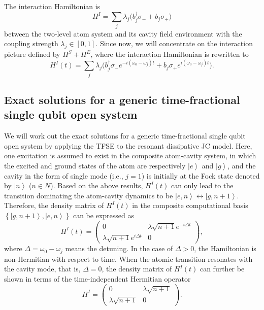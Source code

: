 \documentclass[
showpacs,  %
showkeys,  %
aps,       %
amsthm,    %
amsmath,   %
amsfonts,  %
amssymb    %
]{revtex4-1}          %
\begin{document}
The interaction Hamiltonian is
\begin{equation}
\label{e8}
{H^I} = \sum\limits_j {{\lambda _j}(} b_j^\dag {\sigma _ - } + {b_j}{\sigma _ + })
\end{equation}
between the two-level atom system and its cavity field environment with the coupling strength ${\lambda _j}\in\left[{0,1}\right]$. Since now, we will concentrate on the interaction picture defined by ${H^S} + {H^E}$, where the interaction Hamiltonian is rewritten to
\begin{equation}
\label{e9}
{H^I}(t) = \sum\limits_j {{\lambda _j}(} b_j^\dag {\sigma _ - }{e^{ - i({\omega _0} - {\omega _j})t}} + {b_j}{\sigma _ + }{e^{i({\omega _0} - {\omega _j})t}}).
\end{equation}



\subsection{Exact solutions for a generic time-fractional single qubit open system}
\label{Subsec:23}
We will work out the exact solutions for a generic time-fractional single qubit open system by applying the TFSE to the resonant dissipative JC model. Here, one excitation is assumed to exist in the composite atom-cavity system, in which the excited and ground states of the atom are respectively $\left| e \right\rangle$ and $\left| g \right\rangle$, and the cavity in the form of single mode (i.e., $j=1$) is initially at the Fock state denoted by $\left| n \right\rangle$ ($n\in{N}$). Based on the above results, ${H^I}(t)$ can only lead to the transition dominating the atom-cavity dynamics to be $\left| {e,n} \right\rangle  \leftrightarrow \left| {g,n + 1} \right\rangle$. Therefore, the density matrix of ${H^I}(t)$ in the composite computational basis $\left\{ {\left| {g,n + 1} \right\rangle, \left| {e,n} \right\rangle } \right\}$ can be expressed as
\begin{equation}
\label{e10}
{H^I}(t) = \left( {\begin{array}{*{20}{c}}
0&{\lambda \sqrt {n + 1} {e^{ - i\Delta t}}}\\
{\lambda \sqrt {n + 1} {e^{i\Delta t}}}&0
\end{array}} \right),
\end{equation}
where $\Delta  = {\omega _0} - {\omega _j}$ means the detuning. In the case of $\Delta>0$, the Hamiltonian is non-Hermitian with respect to time. When the atomic transition resonates with the cavity mode, that is, $\Delta=0$, the density matrix of ${H^I}(t)$ can further be shown in terms of the time-independent Hermitian operator
\begin{equation}
\label{e11}
{H^I} = \left( {\begin{array}{*{20}{c}}
0&{\lambda \sqrt {n + 1} }\\
{\lambda \sqrt {n + 1} }&0
\end{array}} \right).
\end{equation}
\end{document}
